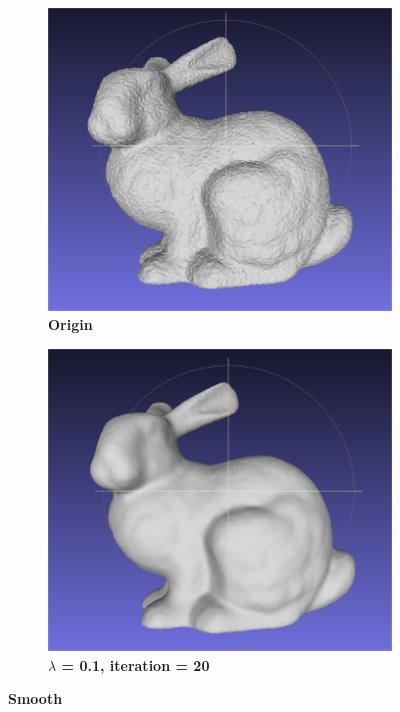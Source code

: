 \documentclass{ctexart}
\begin{document}
\begin{figure}[htbp]
    \centering
    \begin{subfigure}[htbp]{0.45\linewidth}
        \centering
        \includegraphics[width=0.9\linewidth]{figures/0.png}
        \caption{\textbf{Origin}}
    \end{subfigure}
    \begin{subfigure}[htbp]{0.45\linewidth}
        \centering
        \includegraphics[width=0.9\linewidth]{figures/1-20.png}
        \caption{\textbf{$\lambda$ = 0.1, iteration = 20}}
    \end{subfigure}
    \caption{\textbf{Smooth}}
\end{figure}
\end{document}
